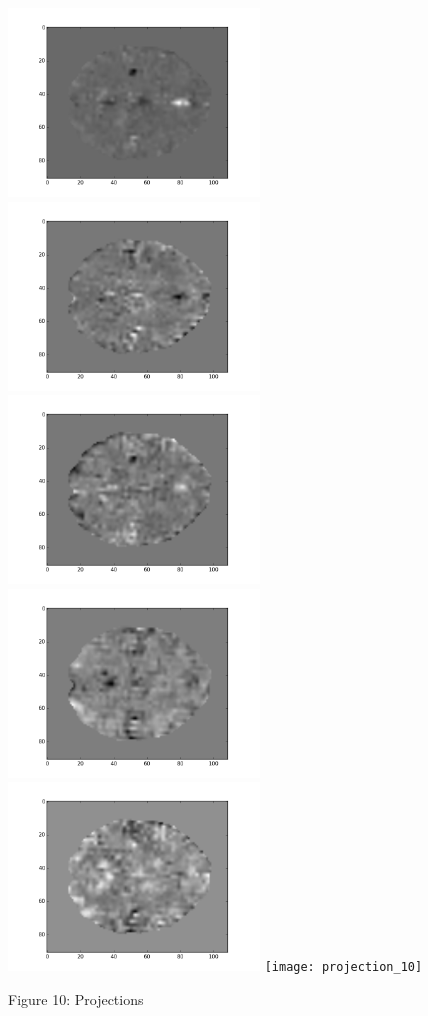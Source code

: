\documentclass[12pt]{article}
\begin{document}
\begin{housevseverything}
      \includegraphics[width=0.5\textwidth]{projection_5}
      \includegraphics[width=0.5\textwidth]{projection_6}
      \includegraphics[width=0.5\textwidth]{projection_7}
      \includegraphics[width=0.5\textwidth]{projection_8}
      \includegraphics[width=0.5\textwidth]{projection_9}
      \texttt{[image: projection\_10]}
    \caption{Figure 10: Projections}
\end{housevseverything}
\end{document}
